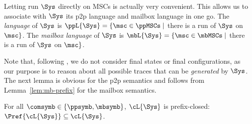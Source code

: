 Letting run $\Sys$ directly on MSCs is actually very convenient.
This allows us to associate with $\Sys$ its p2p language and mailbox language
in one go. The \emph{\pp language} of $\Sys$ is $\ppL{\Sys} = \{\msc \in \ppMSCs \mid$ there is a run of $\Sys$ on $\msc\}$.
The \emph{mailbox language} of $\Sys$ is $\mbL{\Sys} = \{\msc \in \mbMSCs \mid$ there is a run of $\Sys$ on $\msc\}$.

Note that, following \cite{DBLP:conf/cav/BouajjaniEJQ18,DBLP:conf/fossacs/GiustoLL20},
we do not consider final states or final configurations, as our purpose is to
reason about all possible
traces that can be \emph{generated} by $\Sys$.
The next lemma is obvious for the p2p semantics and follows from Lemma~\ref{lem:mb-prefix} for
	the mailbox semantics.

\begin{lemma}\label{lem:prefix-closed}
For all $\comsymb \in \{\ppsymb, \mbsymb\}$, $\cL{\Sys}$ is prefix-closed:
$\Pref{\cL{\Sys}} \subseteq \cL{\Sys}$.
\end{lemma}

